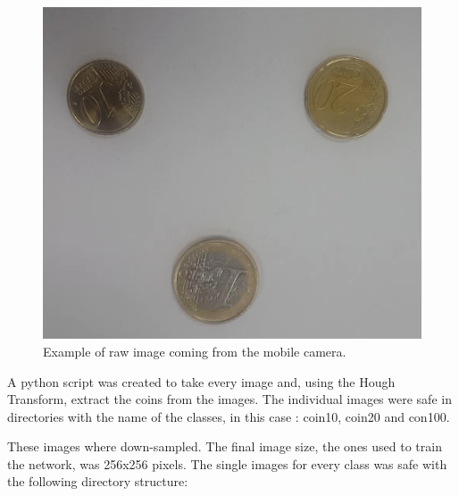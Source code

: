 \documentclass[10pt,journal,compsoc]{IEEEtran}
\begin{document}
\begin{figure}[h]
\centering
\includegraphics[scale=0.10]{inference-raw}
\caption{Example of raw image coming from the mobile camera.}
\label{fig:figure1}
\end{figure}

A python script was created to take every image and, using the Hough Transform, extract the coins from the images. The individual images were safe in directories with the name of the classes, in this case : coin10, coin20 and con100.

These images where down-sampled. The final image size, the ones used to train the network, was 256x256 pixels. The single images for every class was safe with the following directory structure:

\end{document}
